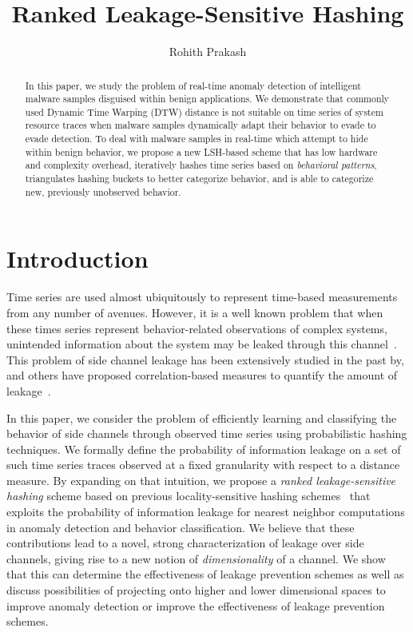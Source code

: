 \documentclass[a4paper]{article}
\title{Ranked Leakage-Sensitive Hashing}
\author{Rohith Prakash}
\date{}
\begin{document}
\maketitle{}

\begin{abstract}
    In this paper, we study the problem of real-time anomaly detection of intelligent malware samples disguised within benign applications. 
    We demonstrate that commonly used Dynamic Time Warping (DTW) distance is not suitable on time series of system resource traces when malware samples dynamically adapt their behavior to evade to evade detection.
    To deal with malware samples in real-time which attempt to hide within benign behavior, we propose a new LSH-based scheme that has low hardware and complexity overhead, iteratively hashes time series based on \textit{behavioral patterns}, triangulates hashing buckets to better categorize behavior, and is able to categorize new, previously unobserved behavior.
\end{abstract}

\section{Introduction}
\label{sec:intro}

Time series are used almost ubiquitously to represent time-based measurements from any number of avenues.
However, it is a well known problem that when these times series represent behavior-related observations of complex systems, unintended information about the system may be leaked through this channel~\cite{DBLP:conf/ccs/RistenpartTSS09,DBLP:conf/sp/ZhangJOR11}.
This problem of side channel leakage has been extensively studied in the past by, and others have proposed correlation-based measures to quantify the amount of leakage~\cite{demme2012,zhang2013}.

In this paper, we consider the problem of efficiently learning and classifying the behavior of side channels through observed time series using probabilistic hashing techniques.
We formally define the probability of information leakage on a set of such time series traces observed at a fixed granularity with respect to a distance measure.
By expanding on that intuition, we propose a \textit{ranked leakage-sensitive hashing} scheme based on previous locality-sensitive hashing schemes~\cite{Kulis12-KLSH,Jiang15-KLSH,Kim16-SLSH} that exploits the probability of information leakage for nearest neighbor computations in anomaly detection and behavior classification.
We believe that these contributions lead to a novel, strong characterization of leakage over side channels, giving rise to a new notion of \textit{dimensionality} of a channel.
We show that this can determine the effectiveness of leakage prevention schemes as well as discuss possibilities of projecting onto higher and lower dimensional spaces to improve anomaly detection or improve the effectiveness of leakage prevention schemes.
\end{document}

